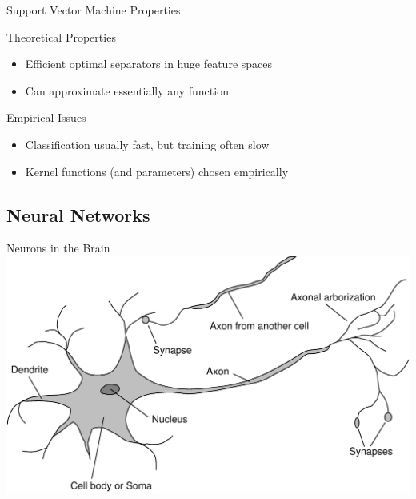 \documentclass[14pt]{beamer}
\begin{document}
\begin{frame}[label=svm-properties]{Support Vector Machine Properties}
\begin{block}{Theoretical Properties}
\begin{itemize}
\item Efficient optimal separators in huge feature spaces
\item Can approximate essentially any function
\end{itemize}
\end{block}
\begin{block}{Empirical Issues}
\begin{itemize}
\item Classification usually fast, but training often slow
\item Kernel functions (and parameters) chosen empirically
\end{itemize}
\end{block}
\end{frame}

\subsection{Neural Networks}

\begin{frame}[label=brain-neuron]{Neurons in the Brain}
\includegraphics[width=\textwidth]{neuron}
\end{frame}
\end{document}
